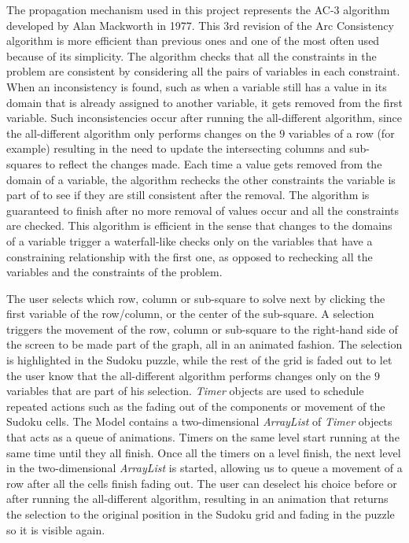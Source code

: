\documentclass{l4proj}
\begin{document}
\noindent The propagation mechanism used in this project represents the AC-3 algorithm developed by Alan Mackworth \cite{mackworth1977consistency} in 1977. This 3rd revision of the Arc Consistency algorithm is more efficient than previous ones and one of the most often used because of its simplicity. The algorithm checks that all the constraints in the problem are consistent by considering all the pairs of variables in each constraint. When an inconsistency is found, such as when a variable still has a value in its domain that is already assigned to another variable, it gets removed from the first variable. Such inconsistencies occur after running the all-different algorithm, since the all-different algorithm only performs changes on the $9$ variables of a row (for example) resulting in the need to update the intersecting columns and sub-squares to reflect the changes made. Each time a value gets removed from the domain of a variable, the algorithm rechecks the other constraints the variable is part of to see if they are still consistent after the removal. The algorithm is guaranteed to finish after no more removal of values occur and all the constraints are checked. This algorithm is efficient in the sense that changes to the domains of a variable trigger a waterfall-like checks only on the variables that have a constraining relationship with the first one, as opposed to rechecking all the variables and the constraints of the problem.

\noindent The user selects which row, column or sub-square to solve next by clicking the first variable of the row/column, or the center of the sub-square. A selection triggers the movement of the row, column or sub-square to the right-hand side of the screen to be made part of the graph, all in an animated fashion. The selection is highlighted in the Sudoku puzzle, while the rest of the grid is faded out to let the user know that the all-different algorithm performs changes only on the $9$ variables that are part of his selection. \textit{Timer} objects are used to schedule repeated actions such as the fading out of the components or movement of the Sudoku cells. The Model contains a two-dimensional \textit{ArrayList} of \textit{Timer} objects that acts as a queue of animations. Timers on the same level start running at the same time until they all finish. Once all the timers on a level finish, the next level in the two-dimensional \textit{ArrayList} is started, allowing us to queue a movement of a row after all the cells finish fading out. The user can deselect his choice before or after running the all-different algorithm, resulting in an animation that returns the selection to the original position in the Sudoku grid and fading in the puzzle so it is visible again.
\end{document}
